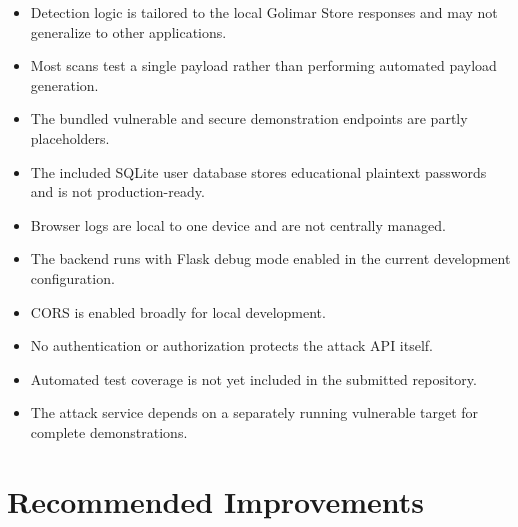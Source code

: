 \documentclass[12pt,a4paper]{article}
\begin{document}
\begin{itemize}[leftmargin=1.4cm]
    \item Detection logic is tailored to the local Golimar Store responses and may not generalize to other applications.
    \item Most scans test a single payload rather than performing automated payload generation.
    \item The bundled vulnerable and secure demonstration endpoints are partly placeholders.
    \item The included SQLite user database stores educational plaintext passwords and is not production-ready.
    \item Browser logs are local to one device and are not centrally managed.
    \item The backend runs with Flask debug mode enabled in the current development configuration.
    \item CORS is enabled broadly for local development.
    \item No authentication or authorization protects the attack API itself.
    \item Automated test coverage is not yet included in the submitted repository.
    \item The attack service depends on a separately running vulnerable target for complete demonstrations.
\end{itemize}

\section{Recommended Improvements}
\end{document}
